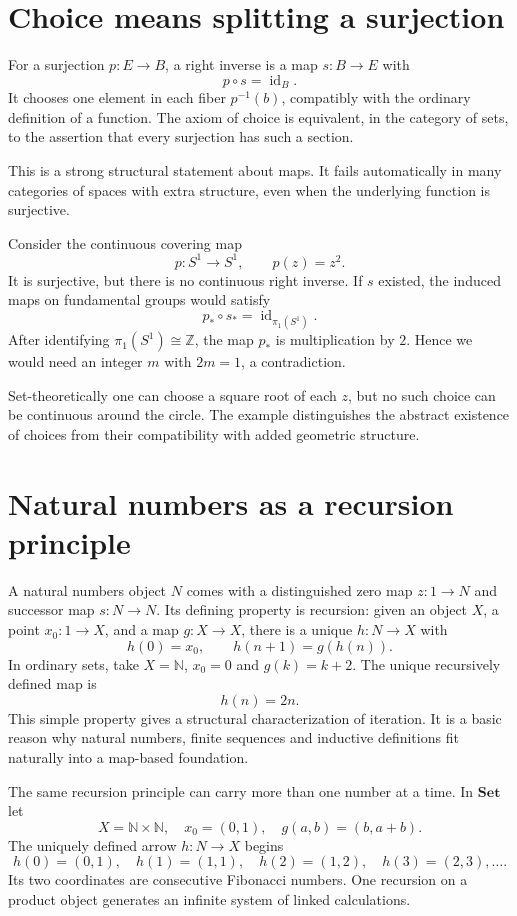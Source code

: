 \section{Choice means splitting a surjection}

For a surjection \(p:E\to B\), a right inverse is a map \(s:B\to E\) with
\[
 p\circ s=\operatorname{id}_B.
\]
It chooses one element in each fiber \(p^{-1}(b)\), compatibly with the ordinary definition of a function. The axiom of choice is equivalent, in the category of sets, to the assertion that every surjection has such a section.

This is a strong structural statement about maps. It fails automatically in many categories of spaces with extra structure, even when the underlying function is surjective.

Consider the continuous covering map
\[
 p:S^1\to S^1,\qquad p(z)=z^2.
\]
It is surjective, but there is no continuous right inverse. If \(s\) existed, the induced maps on fundamental groups would satisfy
\[
 p_*\circ s_*=\operatorname{id}_{\pi_1(S^1)}.
\]
After identifying \(\pi_1(S^1)\cong\mathbb Z\), the map \(p_*\) is multiplication by \(2\). Hence we would need an integer \(m\) with \(2m=1\), a contradiction.

Set-theoretically one can choose a square root of each \(z\), but no such choice can be continuous around the circle. The example distinguishes the abstract existence of choices from their compatibility with added geometric structure.

\section{Natural numbers as a recursion principle}

A natural numbers object \(N\) comes with a distinguished zero map \(z:1\to N\) and successor map \(s:N\to N\). Its defining property is recursion: given an object \(X\), a point \(x_0:1\to X\), and a map \(g:X\to X\), there is a unique \(h:N\to X\) with
\[
 h(0)=x_0,\qquad h(n+1)=g(h(n)).
\]
In ordinary sets, take \(X=\mathbb N\), \(x_0=0\) and \(g(k)=k+2\). The unique recursively defined map is
\[
 h(n)=2n.
\]
This simple property gives a structural characterization of iteration. It is a basic reason why natural numbers, finite sequences and inductive definitions fit naturally into a map-based foundation.

The same recursion principle can carry more than one number at a time. In $\mathbf{Set}$ let
\[
 X=\mathbb N\times\mathbb N,\quad x_0=(0,1),
 \quad g(a,b)=(b,a+b).
\]
The uniquely defined arrow $h:N\to X$ begins
\[
 h(0)=(0,1),\quad h(1)=(1,1),\quad
 h(2)=(1,2),\quad h(3)=(2,3),\ldots .
\]
Its two coordinates are consecutive Fibonacci numbers. One recursion on a product object generates an infinite system of linked calculations.

